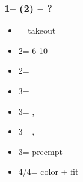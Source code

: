 \documentclass[12pt, a4paper]{article}
\begin{document}
\subsubsection*{1\spades -- (2\hearts) -- ?}
\begin{itemize}
    \item \dbl = takeout
    \item 2\spades = 6-10
    \item 2\nt = \clubs \invp
    \item 3\clubs = \diams \invp
    \item 3\diams = \spades, \gf
    \item 3\hearts = \spades, \inv
    \item 3\spades = preempt
    \item 4\clubs/4\diams = color + fit
\end{itemize}

\end{document}
